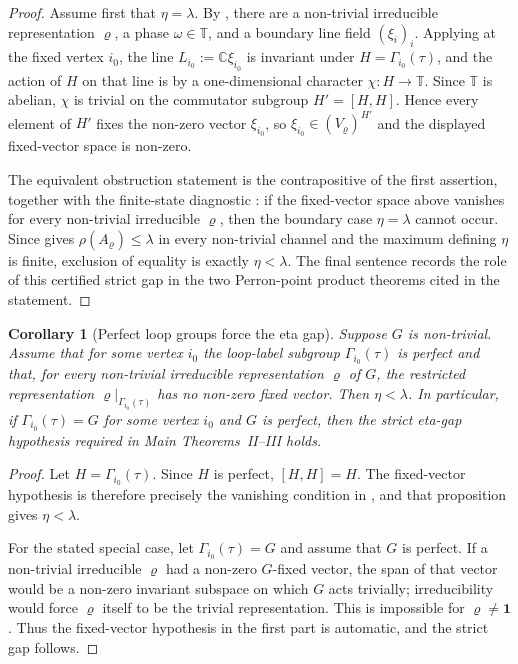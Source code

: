 \documentclass[11pt,a4paper]{amsart}
\theoremstyle{plain}
\newtheorem{corollary}[theorem]{Corollary}
\theoremstyle{definition}
\theoremstyle{remark}
\newcommand{\CC}{\mathbb{C}}
\newcommand{\TT}{\mathbb{T}}
\begin{document}
\begin{proof}
  Assume first that \(\eta=\lambda\).  By
  , there are a non-trivial
  irreducible representation \(\varrho\), a phase \(\omega\in\TT\), and a
  boundary line field \((\xi_i)_i\).  Applying
   at the fixed vertex
  \(i_0\), the line \(L_{i_0}:=\CC\xi_{i_0}\) is invariant under
  \(H=\Gamma_{i_0}(\tau)\), and the action of \(H\) on that line is by a
  one-dimensional character \(\chi:H\to\TT\).  Since \(\TT\) is abelian,
  \(\chi\) is trivial on the commutator subgroup \(H'=[H,H]\).  Hence
  every element of \(H'\) fixes the non-zero vector \(\xi_{i_0}\), so
  \(\xi_{i_0}\in(V_\varrho)^{H'}\) and the displayed fixed-vector space is
  non-zero.

  The equivalent obstruction statement is the contrapositive of the first
  assertion, together with the finite-state diagnostic
  : if the fixed-vector space above
  vanishes for every non-trivial irreducible \(\varrho\), then the
  boundary case \(\eta=\lambda\) cannot occur.  Since
   gives
  \(\rho(A_\varrho)\le\lambda\) in every non-trivial channel and the
  maximum defining \(\eta\) is finite, exclusion of equality is exactly
  \(\eta<\lambda\).  The final sentence records the role of this certified
  strict gap in the two Perron-point product theorems cited in the
  statement.
\end{proof}

\begin{corollary}[Perfect loop groups force the eta gap]
  \label{cor:eta-gap-perfect-group}
  Suppose \(G\) is non-trivial. Assume that for some vertex \(i_0\) the
  loop-label subgroup \(\Gamma_{i_0}(\tau)\) is perfect and that, for every
  non-trivial irreducible representation \(\varrho\) of \(G\), the restricted
  representation \(\varrho|_{\Gamma_{i_0}(\tau)}\) has no non-zero fixed
  vector. Then \(\eta<\lambda\). In particular, if
  \(\Gamma_{i_0}(\tau)=G\) for some vertex \(i_0\) and \(G\) is perfect, then
  the strict eta-gap hypothesis required in Main Theorems~II--III holds.
\end{corollary}

\begin{proof}
  Let \(H=\Gamma_{i_0}(\tau)\).  Since \(H\) is perfect, \([H,H]=H\).  The
  fixed-vector hypothesis is therefore precisely the vanishing condition in
  , and that proposition gives
  \(\eta<\lambda\).

  For the stated special case, let \(\Gamma_{i_0}(\tau)=G\) and assume that
  \(G\) is perfect. If a non-trivial irreducible \(\varrho\) had a non-zero
  \(G\)-fixed vector, the span of that vector would be a
  non-zero invariant subspace on which \(G\) acts trivially; irreducibility
  would force \(\varrho\) itself to be the trivial representation. This is
  impossible for \(\varrho\neq\mathbf1\). Thus the fixed-vector hypothesis
  in the first part is automatic, and the strict gap follows.
\end{proof}
\end{document}
